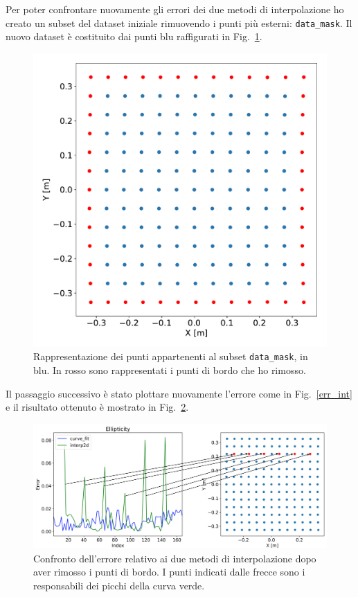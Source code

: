 \documentclass[12pt,a4paper,final]{book}
\begin{document}
Per poter confrontare nuovamente gli errori dei due metodi di interpolazione ho creato un subset del dataset iniziale rimuovendo i punti più esterni: \texttt{data\_mask}. Il nuovo dataset è costituito dai punti blu raffigurati in Fig.~\ref{data_mask}.

\begin{figure}[!ht]
	\centering
	\includegraphics[width=0.6\linewidth]{../figures/PuntiMask.pdf}
	\caption{Rappresentazione dei punti appartenenti al subset \texttt{data\_mask}, in blu. In rosso sono rappresentati i punti di bordo che ho rimosso.}
	\label{data_mask}
\end{figure}

Il passaggio successivo è stato plottare nuovamente l'errore come in Fig.~\ref{err_int} e il risultato ottenuto è mostrato in Fig.~\ref{err_int_mask}.

\begin{figure}[!ht]
	\centering
	\includegraphics[width=\linewidth]{../figures/PuntiProblematiciMask.png}
	\caption{Confronto dell'errore relativo ai due metodi di interpolazione dopo aver rimosso i punti di bordo. I punti indicati dalle frecce sono i responsabili dei picchi della curva verde.}
	\label{err_int_mask}
\end{figure}
\end{document}
